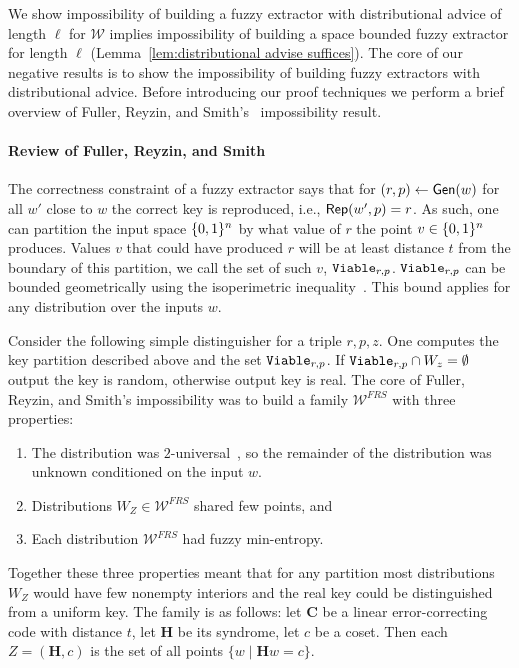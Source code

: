 We show impossibility of building a fuzzy extractor with distributional advice of length $\ell$ for $\mathcal{W}$ implies impossibility of building a space bounded fuzzy extractor for length $\ell$ (Lemma~\ref{lem:distributional advise suffices}). 
The core of our negative results is to show the impossibility of building fuzzy extractors with distributional advice.   Before introducing our proof techniques we perform a brief overview of Fuller, Reyzin, and Smith's~\cite{fuller2020fuzzy} impossibility result.

\paragraph{Review of Fuller, Reyzin, and Smith~\cite{fuller2020fuzzy}}
The correctness constraint of a fuzzy extractor says that for $(r, p)\leftarrow {\ensuremath{\mathsf{Gen}}}(w)$ for all $w'$ close to $w$ the correct key is reproduced, i.e., ${\mathsf{Rep}}(w', p)=r$.  As such, one can partition the input space $\{0, 1\}^n$ by what value of $r$ the point  $v\in \{0, 1\}^n$ produces.  Values $v$ that could have produced  $r$ will be at least distance $t$ from the boundary of this partition, we call the set of such $v$, $\mathtt{Viable}_{r,p}$.  $\mathtt{Viable}_{r,p}$ can be bounded geometrically using the isoperimetric inequality~\cite{harper1966optimal}.  This bound applies for any distribution over the inputs $w$.

Consider the following simple distinguisher for a triple $r, p, z$.  One computes the key partition described above and the set $\mathtt{Viable}_{r,p}$. If $\mathtt{Viable}_{r,p} \cap W_z =\emptyset$ output the key is random, otherwise output key is real. 
The core of Fuller, Reyzin, and Smith's impossibility was to build a family $\mathcal{W}^{FRS}$ with three properties:
\begin{enumerate}
\item The distribution was $2$-universal~\cite{carter1977universal}, so the remainder of the distribution was unknown conditioned on the input $w$. 
\item Distributions $W_Z \in \mathcal{W}^{FRS}$ shared few points, and 
\item Each distribution $\mathcal{W}^{FRS}$ had fuzzy min-entropy.
\end{enumerate}
Together these three properties meant that for any partition most distributions $W_Z$ would have few nonempty interiors and the real key could be distinguished from a uniform key.  
The family is as follows: let $\mathbf{C}$ be a linear error-correcting code with distance $t$, let $\mathbf{H}$ be its syndrome, let $c$ be a coset.  Then each $Z = (\mathbf{H}, c)$ is the set of all points $\{w \mid \mathbf{H} w = c\}$.

